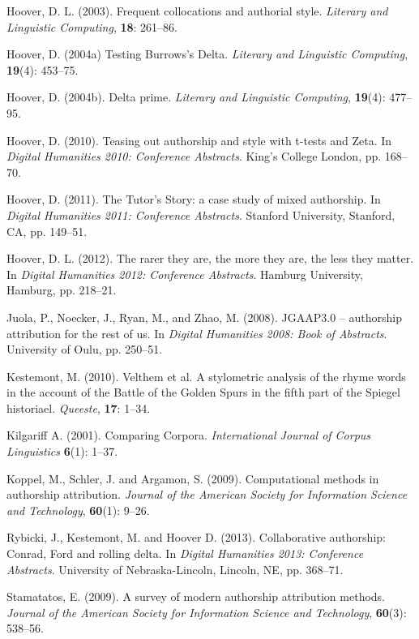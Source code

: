 \documentclass[11pt,a4paper]{article}
\begin{document}
Hoover, D. L. (2003). Frequent collocations and authorial style. 
\textit{Literary and Linguistic Computing}, \textbf{18}: 261--86.

Hoover, D. (2004a) Testing Burrows’s Delta. \textit{Literary and Linguistic
Computing}, \textbf{19}(4): 453--75.

Hoover, D. (2004b). Delta prime. \textit{Literary and Linguistic Computing},
\textbf{19}(4): 477--95.

Hoover, D. (2010). Teasing out authorship and style with t-tests and
Zeta. In \textit{Digital Humanities 2010: Conference Abstracts}. King's
College London, pp. 168--70.

Hoover, D. (2011). The Tutor's Story: a case study of mixed authorship.
In \textit{Digital Humanities 2011: Conference Abstracts}. Stanford
University, Stanford, CA, pp. 149--51.

Hoover, D. L. (2012). The rarer they are, the more they are, the less
they matter. In \textit{Digital Humanities 2012: Conference Abstracts}.
Hamburg University, Hamburg, pp. 218--21.

Juola, P., Noecker, J., Ryan, M., and Zhao, M. (2008). JGAAP3.0 --
authorship attribution for the rest of us. In \textit{Digital Humanities
2008: Book of Abstracts}. University of Oulu, pp. 250--51.

Kestemont, M. (2010). Velthem et al. A stylometric analysis of the
rhyme words in the account of the Battle of the Golden Spurs in the
fifth part of the Spiegel historiael. \textit{Queeste}, \textbf{17}:
1--34.

Kilgariff A. (2001). Comparing Corpora. \textit{International Journal
of Corpus Linguistics} \textbf{6}(1): 1--37.

Koppel, M., Schler, J. and Argamon, S. (2009). Computational methods
in authorship attribution. \textit{Journal of the American Society
for Information Science and Technology}, \textbf{60}(1): 9--26.

Rybicki, J., Kestemont, M. and Hoover D. (2013). Collaborative authorship:
Conrad, Ford and rolling delta. In \textit{Digital Humanities 2013:
Conference Abstracts}. University of Nebraska-Lincoln, Lincoln, NE,
pp. 368--71.

Stamatatos, E. (2009). A survey of modern authorship attribution methods.
\textit{Journal of the American Society for Information Science and
Technology}, \textbf{60}(3): 538--56.
\end{document}
